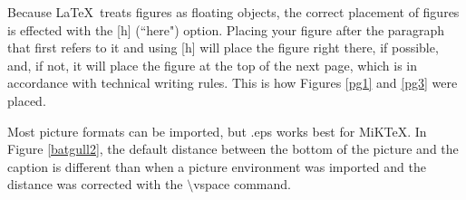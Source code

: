 Because \LaTeX \ treats figures as floating objects,
the correct placement of figures is effected with the
[h] (``here") option.
Placing your figure after the paragraph that first refers to it
and using [h] will place the figure right there, if possible, and,
if not, it will place the figure at the top of the next page,
which is in accordance with technical writing rules.
This is how Figures \ref{pg1} and \ref{pg3} were placed.


%
%
%
%
%
%







Most picture formats can be imported, but
.eps works best for MiK\TeX.
In Figure \ref{batgull2},
the default distance between the
bottom of the picture and the
caption is different than when a
picture environment was imported
and the distance was corrected with the $\setminus $vspace
command.



